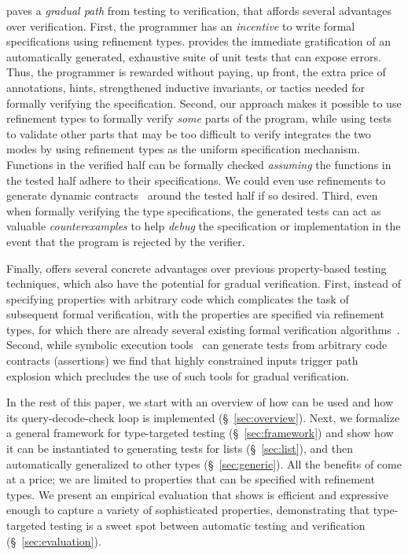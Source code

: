 \toolname paves a \emph{gradual path} from testing to verification, 
that affords several advantages over verification.
%
First, the programmer has an \emph{incentive} to write formal 
specifications using refinement types. \toolname provides the 
immediate gratification of an automatically generated, 
exhaustive suite of unit tests that can expose errors.
Thus, the programmer is rewarded without paying, up front, 
the extra price of annotations, hints, strengthened 
inductive invariants, or tactics needed for formally 
verifying the specification.
%
Second, our approach makes it possible to use refinement 
types to formally verify \emph{some} parts of the program, 
while using tests to validate other parts that may
be too difficult to verify
%
\toolname integrates the two modes by using refinement
types as the uniform specification mechanism. 
Functions in the verified half can be formally checked 
\emph{assuming} the functions in the tested half adhere 
to their specifications. 
We could even use refinements to generate dynamic 
contracts~\cite{Findler01} around the tested half 
if so desired.
%
Third, even when formally verifying the type specifications, 
the generated tests can act as valuable \emph{counterexamples} 
to help \emph{debug} the specification or implementation in 
the event that the program is rejected by the verifier.

Finally, \toolname offers several concrete advantages over previous
property-based testing techniques, which also have the potential for 
gradual verification.
%
First, instead of specifying properties with arbitrary code 
\cite{claessen_quickcheck:_2000,runciman_smallcheck_2008} 
which complicates the task of subsequent formal verification, 
with \toolname the properties are specified via refinement 
types, for which there are already several existing formal 
verification algorithms~\cite{VazouICFP14}.
%
Second, while symbolic execution tools~\cite{DART,CUTE,Veanes08} 
can generate tests from arbitrary code contracts (\eg assertions) 
we find that highly constrained inputs trigger path explosion 
which precludes the use of such tools for gradual verification.

In the rest of this paper, we start with an overview of 
how \toolname can be used and how its query-decode-check 
loop is implemented (\S~\ref{sec:overview}).
%
Next, we formalize a general framework for type-targeted 
testing (\S~\ref{sec:framework}) and show how it can be 
instantiated to generating tests for lists (\S~\ref{sec:list}), 
and then automatically generalized to other 
types (\S~\ref{sec:generic}).
%
All the benefits of \toolname come at a price; 
we are limited to properties that can be specified with 
refinement types. 
%
We present an empirical evaluation that shows
\toolname is efficient and expressive enough to capture 
a variety of sophisticated properties,
%
demonstrating that type-targeted 
testing is
a sweet spot between automatic testing 
and verification (\S~\ref{sec:evaluation}).

